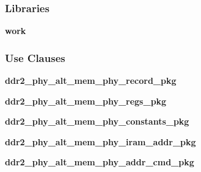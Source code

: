 \subsubsection*{Libraries}
 \begin{DoxyCompactItemize}
\item 
{\bf work} 
\end{DoxyCompactItemize}
\subsubsection*{Use Clauses}
 \begin{DoxyCompactItemize}
\item 
{\bf ddr2\+\_\+phy\+\_\+alt\+\_\+mem\+\_\+phy\+\_\+record\+\_\+pkg}   
\item 
{\bf ddr2\+\_\+phy\+\_\+alt\+\_\+mem\+\_\+phy\+\_\+regs\+\_\+pkg}   
\item 
{\bf ddr2\+\_\+phy\+\_\+alt\+\_\+mem\+\_\+phy\+\_\+constants\+\_\+pkg}   
\item 
{\bf ddr2\+\_\+phy\+\_\+alt\+\_\+mem\+\_\+phy\+\_\+iram\+\_\+addr\+\_\+pkg}   
\item 
{\bf ddr2\+\_\+phy\+\_\+alt\+\_\+mem\+\_\+phy\+\_\+addr\+\_\+cmd\+\_\+pkg}   
\item 
 
\item 
 
\item 
 
\item 
 
\item 
 
\item 
 
\end{DoxyCompactItemize}
